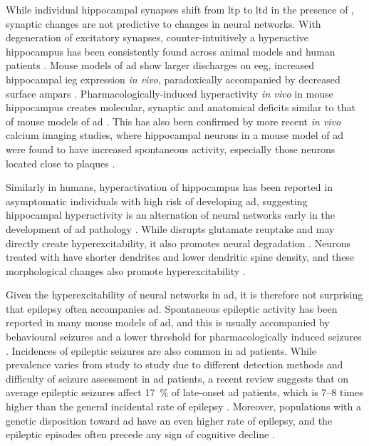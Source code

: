 While individual hippocampal synapses shift from \gls{ltp} to \gls{ltd} in the presence of \abeta{}, synaptic changes are not predictive to changes in neural networks. With degeneration of excitatory synapses, counter-intuitively a hyperactive hippocampus has been consistently found across animal models and human patients \citep{palop16}. Mouse models of \gls{ad} show larger discharges on \gls{eeg}, increased hippocampal \gls{ieg} expression \textit{in vivo}, paradoxically accompanied by decreased surface \glspl{ampar} \citep{palop07, harris10, born14}. Pharmacologically-induced hyperactivity \textit{in vivo} in mouse hippocampus creates molecular, synaptic and anatomical deficits similar to that of mouse models of \gls{ad} \citep{palop07}. This has also been confirmed by more recent \textit{in vivo} calcium imaging studies, where hippocampal neurons in a mouse model of \gls{ad} were found to have increased spontaneous activity, especially those neurons located close to plaques \citep{busche12}. 

Similarly in humans, hyperactivation of hippocampus has been reported in asymptomatic individuals with high risk of developing \gls{ad}, suggesting hippocampal hyperactivity is an alternation of neural networks early in the development of \gls{ad} pathology \citep{sperling09, reiman12}. While \abeta{} disrupts glutamate reuptake and may directly create hyperexcitability, it also promotes neural degradation \citep{spires04, koffie09}. Neurons treated with \abeta{} have shorter dendrites and lower dendritic spine density, and these morphological changes also promote hyperexcitability \citep{siskova14}.

Given the hyperexcitability of neural networks in \gls{ad}, it is therefore not surprising that epilepsy often accompanies \gls{ad}. Spontaneous epileptic activity has been reported in many mouse models of \gls{ad}, and this is usually accompanied by behavioural seizures and a lower threshold for pharmacologically induced seizures \citep{palop07, ittner10, um12}. Incidences of epileptic seizures are also common in \gls{ad} patients. While prevalence varies from study to study due to different detection methods and difficulty of seizure assessment in \gls{ad} patients, a recent review suggests that on average epileptic seizures affect \SI{17}{\percent} of late-onset \gls{ad} patients, which is 7--8 times higher than the general incidental rate of epilepsy \citep{amatniek06, horvath16}. Moreover, populations with a genetic disposition toward \gls{ad} have an even higher rate of epilepsy, and the epileptic episodes often precede any sign of cognitive decline \citep{moehlmann02,cabrejo06,mcnaughton12}. 


